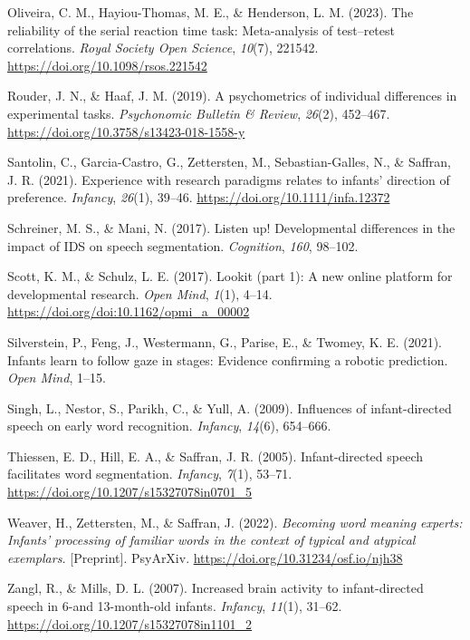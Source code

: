 \documentclass[
  man,floatsintext]{apa6}
\newlength{\cslhangindent}
\newlength{\cslentryspacingunit} %
\newenvironment{CSLReferences}[2] %
 {%
  \setlength{\parindent}{0pt}
  \ifodd #1
  \let\oldpar\par
  \def\par{\hangindent=\cslhangindent\oldpar}
  \fi
  \setlength{\parskip}{#2\cslentryspacingunit}
 }%
 {}
\begin{document}
\begin{CSLReferences}{1}{0}
\leavevmode{}%
Oliveira, C. M., Hayiou-Thomas, M. E., \& Henderson, L. M. (2023). The reliability of the serial reaction time task: Meta-analysis of test--retest correlations. \emph{Royal Society Open Science}, \emph{10}(7), 221542. \url{https://doi.org/10.1098/rsos.221542}

\leavevmode{}%
Rouder, J. N., \& Haaf, J. M. (2019). A psychometrics of individual differences in experimental tasks. \emph{Psychonomic Bulletin \& Review}, \emph{26}(2), 452--467. \url{https://doi.org/10.3758/s13423-018-1558-y}

\leavevmode{}%
Santolin, C., Garcia-Castro, G., Zettersten, M., Sebastian-Galles, N., \& Saffran, J. R. (2021). Experience with research paradigms relates to infants' direction of preference. \emph{Infancy}, \emph{26}(1), 39--46. \url{https://doi.org/10.1111/infa.12372}

\leavevmode{}%
Schreiner, M. S., \& Mani, N. (2017). Listen up! Developmental differences in the impact of IDS on speech segmentation. \emph{Cognition}, \emph{160}, 98--102.

\leavevmode{}%
Scott, K. M., \& Schulz, L. E. (2017). Lookit (part 1): A new online platform for developmental research. \emph{Open Mind}, \emph{1}(1), 4--14. \url{https://doi.org/doi:10.1162/opmi_a_00002}

\leavevmode{}%
Silverstein, P., Feng, J., Westermann, G., Parise, E., \& Twomey, K. E. (2021). Infants learn to follow gaze in stages: Evidence confirming a robotic prediction. \emph{Open Mind}, 1--15.

\leavevmode{}%
Singh, L., Nestor, S., Parikh, C., \& Yull, A. (2009). Influences of infant-directed speech on early word recognition. \emph{Infancy}, \emph{14}(6), 654--666.

\leavevmode{}%
Thiessen, E. D., Hill, E. A., \& Saffran, J. R. (2005). Infant-directed speech facilitates word segmentation. \emph{Infancy}, \emph{7}(1), 53--71. \url{https://doi.org/10.1207/s15327078in0701_5}

\leavevmode{}%
Weaver, H., Zettersten, M., \& Saffran, J. (2022). \emph{Becoming word meaning experts: Infants' processing of familiar words in the context of typical and atypical exemplars.} {[}Preprint{]}. PsyArXiv. \url{https://doi.org/10.31234/osf.io/njh38}

\leavevmode{}%
Zangl, R., \& Mills, D. L. (2007). Increased brain activity to infant-directed speech in 6-and 13-month-old infants. \emph{Infancy}, \emph{11}(1), 31--62. \url{https://doi.org/10.1207/s15327078in1101_2}

\end{CSLReferences}

\endgroup
\end{document}
